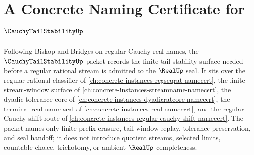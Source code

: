 \chapter{A Concrete Naming Certificate for $\CauchyTailStabilityUp$}
\label{ch:concrete-instances-cauchy-tail-stability-namecert}

Following Bishop and Bridges on regular Cauchy real names, the $\CauchyTailStabilityUp$ packet records the finite-tail stability surface needed before a regular rational stream is admitted to the $\RealUp$ seal. It sits over the regular rational classifier of \autoref{ch:concrete-instances-regseqrat-namecert}, the finite stream-window surface of \autoref{ch:concrete-instances-streamname-namecert}, the dyadic tolerance core of \autoref{ch:concrete-instances-dyadicratcore-namecert}, the terminal real-name seal of \autoref{ch:concrete-instances-real-namecert}, and the regular Cauchy shift route of \autoref{ch:concrete-instances-regular-cauchy-shift-namecert}. The packet names only finite prefix erasure, tail-window replay, tolerance preservation, and seal handoff; it does not introduce quotient streams, selected limits, countable choice, trichotomy, or ambient $\RealUp$ completeness.


